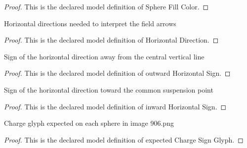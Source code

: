 \begin{proof}
  This is the declared model definition of Sphere Fill Color.
\end{proof}
\begin{definition}
  \label{def:physics:phyx-mini-0906:phyxminiproblems-problemphyxmini0906-horizontaldirection}
  Horizontal directions needed to interpret the field arrows
\end{definition}
\begin{proof}
  This is the declared model definition of Horizontal Direction.
\end{proof}
\begin{definition}
  \label{def:physics:phyx-mini-0906:phyxminiproblems-problemphyxmini0906-outwardhorizontalsign}
  Sign of the horizontal direction away from the central vertical line
\end{definition}
\begin{proof}
  This is the declared model definition of outward Horizontal Sign.
\end{proof}
\begin{definition}
  \label{def:physics:phyx-mini-0906:phyxminiproblems-problemphyxmini0906-inwardhorizontalsign}
  Sign of the horizontal direction toward the common suspension point
\end{definition}
\begin{proof}
  This is the declared model definition of inward Horizontal Sign.
\end{proof}
\begin{definition}
  \label{def:physics:phyx-mini-0906:phyxminiproblems-problemphyxmini0906-expectedchargesignglyph}
  Charge glyph expected on each sphere in image 906.png
\end{definition}
\begin{proof}
  This is the declared model definition of expected Charge Sign Glyph.
\end{proof}
